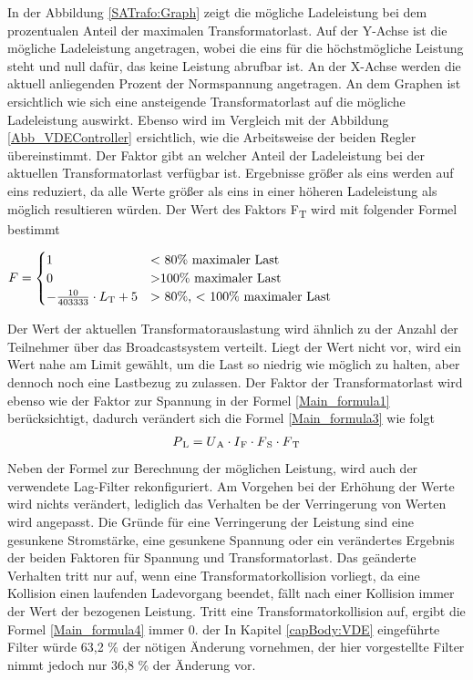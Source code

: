 In der Abbildung \ref{SATrafo:Graph} zeigt die mögliche Ladeleistung bei dem prozentualen Anteil der maximalen Transformatorlast. Auf der Y-Achse ist die mögliche Ladeleistung angetragen, wobei die eins für die höchstmögliche Leistung steht und null dafür, das keine Leistung abrufbar ist. An der X-Achse werden die aktuell anliegenden Prozent der Normspannung angetragen. An dem Graphen ist ersichtlich wie sich eine ansteigende Transformatorlast auf die mögliche Ladeleistung auswirkt. Ebenso wird im Vergleich mit der Abbildung \ref{Abb_VDEController} ersichtlich, wie die Arbeitsweise der beiden Regler übereinstimmt. Der Faktor gibt an welcher Anteil der Ladeleistung bei der aktuellen Transformatorlast verfügbar ist. Ergebnisse größer als eins werden auf eins reduziert, da alle Werte größer als eins in einer höheren Ladeleistung als möglich resultieren würden. Der Wert des Faktors F\textsubscript{T} wird mit folgender Formel bestimmt \\
\begin{center}
	$ F = \begin{cases}
	1 &  \text{$<$ 80\% maximaler Last} \\
	0 &  \text{$>$100\% maximaler Last} \\
	- \frac{10}{403333} \cdot L\textsubscript{T} + 5 & \text{$>$ 80\%, $<$ 100\% maximaler Last}
	\end{cases}$
\end{center}
Der Wert der aktuellen Transformatorauslastung wird ähnlich zu der Anzahl der Teilnehmer über das Broadcastsystem verteilt. Liegt der Wert nicht vor, wird ein Wert nahe am Limit gewählt, um die Last so niedrig wie möglich zu halten, aber dennoch noch eine Lastbezug zu zulassen. Der Faktor der Transformatorlast wird ebenso wie der Faktor zur Spannung in der Formel \ref{Main_formula1} berücksichtigt, dadurch verändert sich die Formel \ref{Main_formula3} wie folgt
\begin{align}
	P\textsubscript{L} = U\textsubscript{A} \cdot I\textsubscript{F} \cdot F\textsubscript{S} \cdot F\textsubscript{T} \label{Main_formula4}
\end{align}
Neben der Formel zur Berechnung der möglichen Leistung, wird auch der verwendete Lag-Filter rekonfiguriert. Am Vorgehen bei der Erhöhung der Werte wird nichts verändert, lediglich das Verhalten be der Verringerung von Werten wird angepasst. Die Gründe für eine Verringerung der Leistung sind eine gesunkene Stromstärke, eine gesunkene Spannung oder ein verändertes Ergebnis der beiden Faktoren für Spannung und Transformatorlast. Das geänderte Verhalten tritt nur auf, wenn eine Transformatorkollision vorliegt, da eine Kollision einen laufenden Ladevorgang beendet, fällt nach einer Kollision immer der Wert der bezogenen Leistung. Tritt eine Transformatorkollision auf, ergibt die Formel \ref{Main_formula4} immer 0. der In Kapitel \ref{capBody:VDE} eingeführte Filter würde 63,2 \% der nötigen Änderung vornehmen, der hier vorgestellte Filter nimmt jedoch nur 36,8 \% der Änderung vor.
